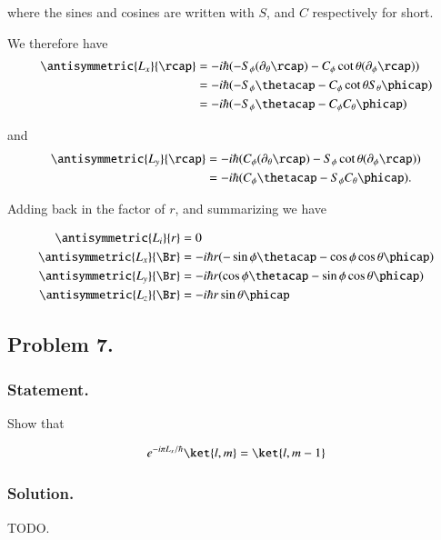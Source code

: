 where the sines and cosines are written with $S$, and $C$ respectively for short.

We therefore have
\begin{align*}
\antisymmetric{L_x}{\rcap}
&= -i \hbar (-S_\phi (\partial_\theta \rcap) - C_\phi \cot\theta (\partial_\phi \rcap) ) \\
&= -i \hbar (-S_\phi \thetacap - C_\phi \cot\theta S_\theta \phicap ) \\
&= -i \hbar (-S_\phi \thetacap - C_\phi C_\theta \phicap ) \\
\end{align*}

and
\begin{align*}
\antisymmetric{L_y}{\rcap}
&= -i \hbar (C_\phi (\partial_\theta \rcap) - S_\phi \cot\theta (\partial_\phi \rcap)) \\
&= -i \hbar (C_\phi \thetacap - S_\phi C_\theta \phicap ).
\end{align*}

Adding back in the factor of $r$, and summarizing we have

\begin{align}\label{eqn:desaiCh4:620}
\antisymmetric{L_i}{r} &= 0 \\
\antisymmetric{L_x}{\Br} &= -i \hbar r (-\sin\phi \thetacap - \cos\phi \cos\theta \phicap ) \\
\antisymmetric{L_y}{\Br} &= -i \hbar r (\cos\phi \thetacap - \sin\phi \cos\theta \phicap ) \\
\antisymmetric{L_z}{\Br} &= -i \hbar r \sin\theta \phicap
\end{align}

\subsection{Problem 7.}
\subsubsection{Statement.}

Show that

\begin{align}\label{eqn:desaiCh4:700}
e^{-i\pi L_x /\hbar } \ket{l,m} = \ket{l,m-1}
\end{align}

\subsubsection{Solution.}

TODO.

\EndArticle
